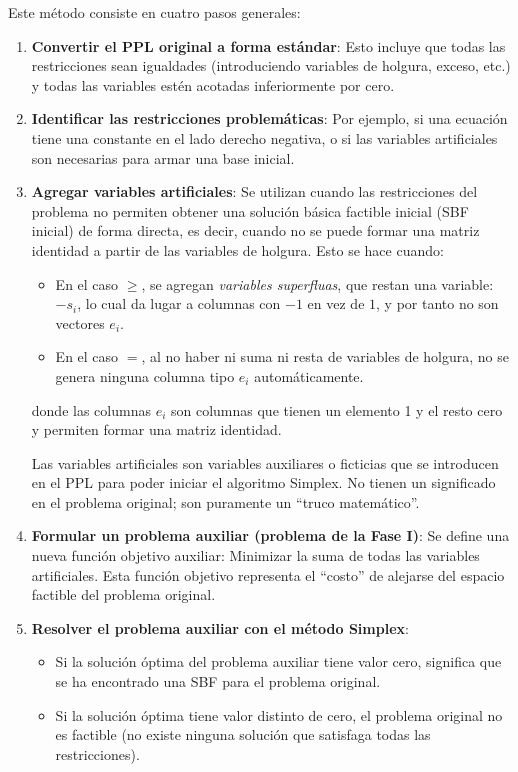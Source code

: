 Este método consiste en cuatro pasos generales:
\begin{enumerate}

  \item \textbf{Convertir el PPL original a forma estándar}: Esto incluye que todas las restricciones sean igualdades (introduciendo variables de holgura, exceso, etc.) y todas las variables estén acotadas inferiormente por cero.

  \item \textbf{Identificar las restricciones problemáticas}: Por ejemplo, si una ecuación tiene una constante en el lado derecho negativa, o si las variables artificiales son necesarias para armar una base inicial.

  \item \textbf{Agregar variables artificiales}: Se utilizan cuando las restricciones del problema no permiten obtener una solución básica factible inicial (SBF inicial) de forma directa, es decir, cuando no se puede formar una matriz identidad a partir de las variables de holgura. Esto se hace cuando:
    \begin{itemize}
      \item En el caso \(\geq\), se agregan \textit{variables superfluas}, que restan una variable: \(-s_i\), lo cual da lugar a columnas con \(-1\) en vez de \(1\), y por tanto no son vectores \(e_i\).
      \item En el caso \(=\), al no haber ni suma ni resta de variables de holgura, no se genera ninguna columna tipo \(e_i\) automáticamente.
    \end{itemize}
    donde las columnas \(e_i\) son columnas que tienen un elemento 1 y el resto cero y permiten formar una matriz identidad.
  \begin{tcolorbox}[myconclusion]
    Las variables artificiales son variables auxiliares o ficticias que se introducen en el PPL para poder iniciar el algoritmo Simplex. No tienen un significado en el problema original; son puramente un ``truco matemático''.
  \end{tcolorbox}

  \item \textbf{Formular un problema auxiliar (problema de la Fase I)}: Se define una nueva función objetivo auxiliar: Minimizar la suma de todas las variables artificiales. Esta función objetivo representa el “costo” de alejarse del espacio factible del problema original.

  \item \textbf{Resolver el problema auxiliar con el método Simplex}: 
  \begin{itemize}
    \item Si la solución óptima del problema auxiliar tiene valor cero, significa que se ha encontrado una SBF para el problema original.
    \item Si la solución óptima tiene valor distinto de cero, el problema original no es factible (no existe ninguna solución que satisfaga todas las restricciones).
  \end{itemize}


\end{enumerate}
